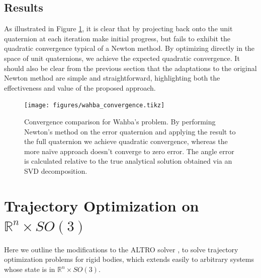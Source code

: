 \documentclass[letterpaper, 10 pt, conference]{ieeeconf}  %
\newcommand{\R}{\mathbb{R}}
\begin{document}
    \subsection{Results}
    As illustrated in Figure \ref{fig:wahba_convergence}, it is clear that by projecting 
    back onto the unit quaternion at each iteration make initial progress, but fails to 
    exhibit the quadratic convergence typical of a Newton method. By optimizing directly 
    in the space of unit quaternions, we achieve the expected quadratic convergence.
    It should also be clear from the previous section that the adaptations to the original
    Newton method are simple and straightforward, highlighting both the effectiveness and
    value of the proposed approach.
    \begin{figure}

        \centering
        \texttt{[image: figures/wahba\_convergence.tikz]}
        \caption{Convergence comparison for Wahba's problem. By performing Newton's method
        on the error quaternion and applying the result to the full quaternion we achieve
        quadratic convergence, whereas the more na\"ive approach doesn't converge to zero
        error. The angle error is calculated relative to the true analytical solution obtained
        via an SVD decomposition.}
        \label{fig:wahba_convergence}
    \end{figure}

\section{Trajectory Optimization on $\R^n \times SO(3)$} \label{sec:trajopt}
    Here we outline the modifications to the ALTRO solver \cite{howell2019altro}, to
    solve trajectory optimization problems for rigid bodies, which extends easily to
    arbitrary systems whose state is in $\R^n \times SO(3)$. %
\end{document}
